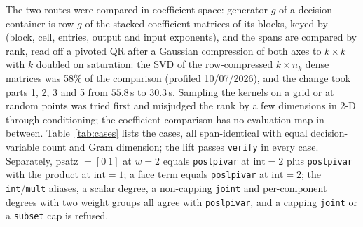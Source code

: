 \documentclass[12pt]{article}
\newcommand{\code}[1]{\texttt{#1}}
\theoremstyle{plain}
\theoremstyle{definition}
\theoremstyle{remark}
\begin{document}
The two routes were compared in coefficient space: generator $g$ of a decision container is row $g$ of the stacked coefficient matrices of its blocks, keyed by (block, cell, entries, output and input exponents), and the spans are compared by rank, read off a pivoted QR after a Gaussian compression of both axes to $k\times k$ with $k$ doubled on saturation: the SVD of the row-compressed $k\times n_k$ dense matrices was 58\% of the comparison (profiled 10/07/2026), and the change took parts 1, 2, 3 and 5 from $55.8$\,s to $30.3$\,s. Sampling the kernels on a grid or at random points was tried first and misjudged the rank by a few dimensions in 2-D through conditioning; the coefficient comparison has no evaluation map in between. Table~\ref{tab:cases} lists the cases, all span-identical with equal decision-variable count and Gram dimension; the lift passes \code{verify} in every case. Separately, psatz $=[0\ 1]$ at $w=2$ equals \code{poslpivar} at $\mathrm{int}=2$ plus \code{poslpivar} with the product at $\mathrm{int}=1$; a face term equals \code{poslpivar} at $\mathrm{int}=2$; the \code{int}/\code{mult} aliases, a scalar degree, a non-capping \code{joint} and per-component degrees with two weight groups all agree with \code{poslpivar}, and a capping \code{joint} or a \code{subset} cap is refused.
\end{document}
